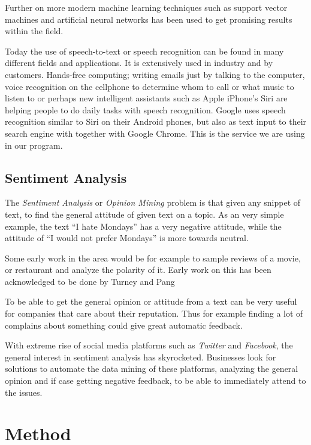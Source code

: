 \documentclass[a4paper,12pt,twoside]{ltxdoc}
\begin{document}
Further on more modern machine learning techniques such as support vector machines and artificial neural networks has been used to get promising results within the field.

Today the use of speech-to-text or speech recognition can be found in many different fields and applications. It is extensively used in industry and by customers. Hands-free computing; writing emails just by talking to the computer, voice recognition on the cellphone to determine whom to call or what music to listen to or perhaps new intelligent assistants such as Apple iPhone's Siri are helping people to do daily tasks with speech recognition. Google uses speech recognition similar to Siri on their Android phones, but also as text input to their search engine with together with Google Chrome. This is the service we are using in our program.



\subsection{Sentiment Analysis}
The \emph{Sentiment Analysis} or \emph{Opinion Mining} problem is that given any snippet of text, to find the general attitude of given text on a topic.
As an very simple example, the text ``I hate Mondays'' has a very negative attitude, while the attitude of ``I would not prefer Mondays'' is more towards neutral.

Some early work in the area would be for example to sample reviews of a movie, or restaurant and analyze the polarity of it. Early work on this has been acknowledged to be done by Turney\cite{turney} and Pang\cite{pang}

To be able to get the general opinion or attitude from a text can be very useful for companies that care about their reputation.
Thus for example finding a lot of complains about something could give great automatic feedback.

With extreme rise of social media platforms such as \emph{Twitter} and \emph{Facebook}, the general interest in sentiment analysis has skyrocketed. Businesses look for solutions to automate the data mining of these platforms, analyzing the general opinion and if case getting negative feedback, to be able to immediately attend to the issues.

\section{Method}
\end{document}
